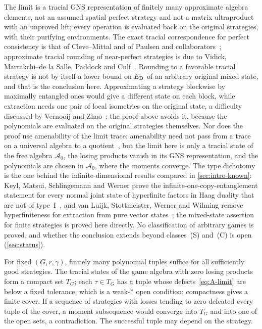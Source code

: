 \begin{remark}\label{rem:A-scope}
The limit is a tracial GNS representation of finitely many approximate algebra elements, not an assumed spatial perfect
strategy and not a matrix ultraproduct with an unproved lift; every operation is evaluated back on the original
strategies, with their purifying environments. The exact tracial correspondence for perfect consistency is that of
Cleve--Mittal and of Paulsen and collaborators~\cite{CM14,PSSTW16,KPS18}; approximate tracial rounding of near-perfect
strategies is due to Vidick, Marrakchi--de la Salle, Paddock and Culf~\cite{Vid22,MdlS23,Pad22,Cul26}. Rounding to a
favorable tracial strategy is not by itself a lower bound on $E_{\mathrm D}$ of an arbitrary original mixed state, and that is the
conclusion here. Approximating a strategy blockwise by maximally entangled ones would give a different state on each block, while
extraction needs one pair of local isometries on the original state, a difficulty discussed by Vernooij and
Zhao~\cite[Section~1.2]{VZ26}; the proof above avoids it, because the polynomials are evaluated on the original strategies
themselves. Nor does the proof use amenability of the limit trace: amenability need not pass from a trace on a universal algebra
to a quotient~\cite[Remark~5.15]{Zha24}, but the limit here is only a tracial state of the free algebra $\mathcal A_0$, the losing
products vanish in its GNS representation, and the polynomials are chosen in $\mathcal A_0$, where the moments converge. The
type dichotomy is the one behind the infinite-dimensional results compared in \cref{sec:intro-known}: Keyl, Matsui, Schlingemann
and Werner prove the infinite-one-copy-entanglement statement for every normal joint state of hyperfinite factors in Haag duality
that are not of type~I~\cite[Theorem~4.9]{KMSW06}, and van Luijk, Stottmeister, Werner and Wilming remove hyperfiniteness for
extraction from pure vector states~\cite[Theorem~54]{vLSWW25}; the mixed-state assertion for finite strategies is proved here
directly. No classification of arbitrary games is proved, and whether the conclusion extends beyond classes~(S) and~(C) is open
(\cref{sec:status}).
\end{remark}

\begin{remark}\label{rem:finite-menu}
For fixed $(G,r,\gamma)$, finitely many polynomial tuples suffice for all sufficiently good strategies. The tracial
states of the game algebra with zero losing products form a compact set $T_G$; each $\tau\in T_G$ has a tuple whose
defects~\eqref{eq:A-limit} are below a fixed tolerance, which is a weak-$*$ open condition; compactness gives a finite
cover. If a sequence of strategies with losses tending to zero defeated every tuple of the cover, a moment subsequence
would converge into $T_G$ and into one of the open sets, a contradiction. The successful tuple may depend on the strategy.
\end{remark}

